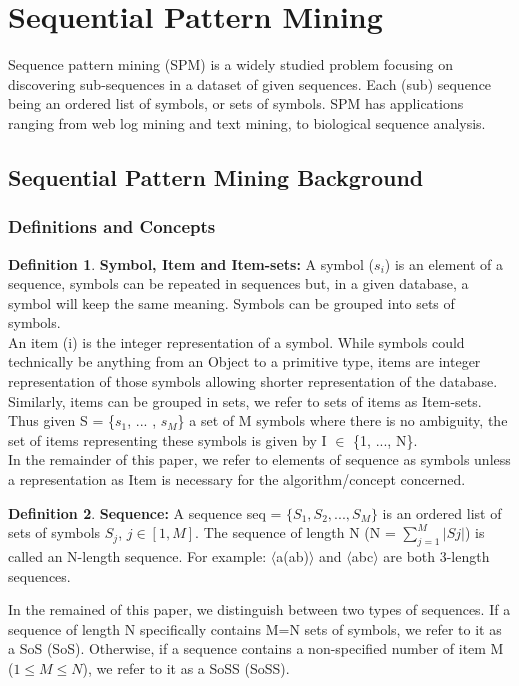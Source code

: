\documentclass{eplmastersthesis}
\begin{document}
\newpage
\section{Sequential Pattern Mining}

Sequence pattern mining (SPM) is a widely studied problem focusing on discovering sub-sequences in a dataset of given sequences. Each (sub) sequence being an ordered list of symbols, or sets of symbols. SPM has applications ranging from web log mining and text mining, to biological sequence analysis.

\subsection{Sequential Pattern Mining Background}

\subsubsection{Definitions and Concepts}

\theoremstyle{definition}
\newtheorem{definition}{Definition}[]

\theoremstyle{example}
\newtheorem{example}{Example}[]

\begin{definition}{\bfseries Symbol, Item and Item-sets:}
A symbol ($s_i$) is an element of a sequence, symbols can be repeated in sequences but, in a given database, a symbol will keep the same meaning. Symbols can be grouped into sets of symbols. \\
An item (i) is the integer representation of a symbol. While symbols could technically be anything from an Object to a primitive type, items are integer representation of those symbols allowing shorter representation of the database. Similarly, items can be grouped in sets, we refer to sets of items as Item-sets. Thus given S = \{$s_1$, ... , $s_M$\} a set of M symbols where there is no ambiguity, the set of items representing these symbols is given by I $\in$ \{1, ..., N\}. \\
In the remainder of this paper, we refer to elements of sequence as symbols unless a representation as Item is necessary for the algorithm/concept concerned.

\end{definition}

\begin{definition}{\bfseries Sequence:}
A sequence seq = $\{S_1, S_2, ..., S_M\}$ is an ordered list of sets of symbols $S_j$, $j \in [1, M]$. The sequence of length N (N = $\sum_{j = 1}^{M} |Sj|$) is called an N-length sequence. For example: $\langle$a(ab)$\rangle$ and $\langle$abc$\rangle$ are both 3-length sequences.

In the remained of this paper, we distinguish between two types of sequences. If a sequence of length N specifically contains M=N sets of symbols, we refer to it as a \acrlong{SoS} (\acrshort{SoS}). Otherwise, if a sequence contains a non-specified number of item M ($1 \leq M \leq N$), we refer to it as a \acrlong{SoSS} (\acrshort{SoSS}).
\end{definition}
\end{document}
